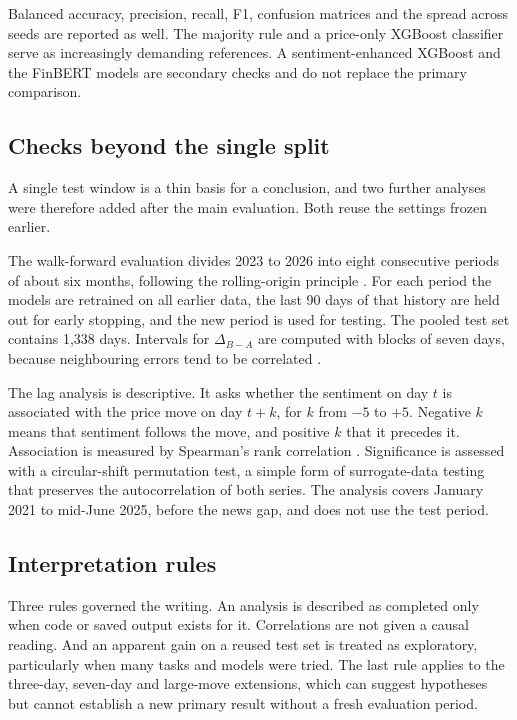 Balanced accuracy, precision, recall, F1, confusion matrices and the spread across seeds are reported as well. The majority rule and a price-only XGBoost classifier serve as increasingly demanding references. A sentiment-enhanced XGBoost and the FinBERT models are secondary checks and do not replace the primary comparison.

\subsection{Checks beyond the single split}
A single test window is a thin basis for a conclusion, and two further analyses were therefore added after the main evaluation. Both reuse the settings frozen earlier.

The walk-forward evaluation divides 2023 to 2026 into eight consecutive periods of about six months, following the rolling-origin principle \cite{tashman2000}. For each period the models are retrained on all earlier data, the last 90 days of that history are held out for early stopping, and the new period is used for testing. The pooled test set contains 1,338 days. Intervals for $\Delta_{B-A}$ are computed with blocks of seven days, because neighbouring errors tend to be correlated \cite{kunsch1989}.

The lag analysis is descriptive. It asks whether the sentiment on day $t$ is associated with the price move on day $t+k$, for $k$ from $-5$ to $+5$. Negative $k$ means that sentiment follows the move, and positive $k$ that it precedes it. Association is measured by Spearman's rank correlation \cite{spearman1904}. Significance is assessed with a circular-shift permutation test, a simple form of surrogate-data testing \cite{theiler1992} that preserves the autocorrelation of both series. The analysis covers January 2021 to mid-June 2025, before the news gap, and does not use the test period.

\subsection{Interpretation rules}
Three rules governed the writing. An analysis is described as completed only when code or saved output exists for it. Correlations are not given a causal reading. And an apparent gain on a reused test set is treated as exploratory, particularly when many tasks and models were tried. The last rule applies to the three-day, seven-day and large-move extensions, which can suggest hypotheses but cannot establish a new primary result without a fresh evaluation period.
